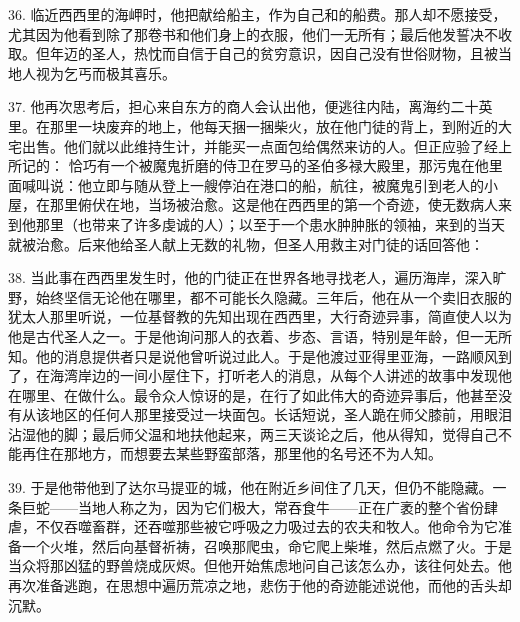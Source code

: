 36. 临近西西里的海岬时，他把献给船主，作为自己和的船费。那人却不愿接受，尤其因为他看到除了那卷书和他们身上的衣服，他们一无所有；最后他发誓决不收取。但年迈的圣人，热忱而自信于自己的贫穷意识，因自己没有世俗财物，且被当地人视为乞丐而极其喜乐。\par

37. 他再次思考后，担心来自东方的商人会认出他，便逃往内陆，离海约二十英里。在那里一块废弃的地上，他每天捆一捆柴火，放在他门徒的背上，到附近的大宅出售。他们就以此维持生计，并能买一点面包给偶然来访的人。但正应验了经上所记的： 恰巧有一个被魔鬼折磨的侍卫在罗马的圣伯多禄大殿里，那污鬼在他里面喊叫说：他立即与随从登上一艘停泊在港口的船，航往，被魔鬼引到老人的小屋，在那里俯伏在地，当场被治愈。这是他在西西里的第一个奇迹，使无数病人来到他那里（也带来了许多虔诚的人）；以至于一个患水肿肿胀的领袖，来到的当天就被治愈。后来他给圣人献上无数的礼物，但圣人用救主对门徒的话回答他： \par

38. 当此事在西西里发生时，他的门徒正在世界各地寻找老人，遍历海岸，深入旷野，始终坚信无论他在哪里，都不可能长久隐藏。三年后，他在从一个卖旧衣服的犹太人那里听说，一位基督教的先知出现在西西里，大行奇迹异事，简直使人以为他是古代圣人之一。于是他询问那人的衣着、步态、言语，特别是年龄，但一无所知。他的消息提供者只是说他曾听说过此人。于是他渡过亚得里亚海，一路顺风到了，在海湾岸边的一间小屋住下，打听老人的消息，从每个人讲述的故事中发现他在哪里、在做什么。最令众人惊讶的是，在行了如此伟大的奇迹异事后，他甚至没有从该地区的任何人那里接受过一块面包。长话短说，圣人跪在师父膝前，用眼泪沾湿他的脚；最后师父温和地扶他起来，两三天谈论之后，他从得知，觉得自己不能再住在那地方，而想要去某些野蛮部落，那里他的名号还不为人知。\par

39. 于是他带他到了达尔马提亚的城，他在附近乡间住了几天，但仍不能隐藏。一条巨蛇——当地人称之为，因为它们极大，常吞食牛——正在广袤的整个省份肆虐，不仅吞噬畜群，还吞噬那些被它呼吸之力吸过去的农夫和牧人。他命令为它准备一个火堆，然后向基督祈祷，召唤那爬虫，命它爬上柴堆，然后点燃了火。于是当众将那凶猛的野兽烧成灰烬。但他开始焦虑地问自己该怎么办，该往何处去。他再次准备逃跑，在思想中遍历荒凉之地，悲伤于他的奇迹能述说他，而他的舌头却沉默。\par

